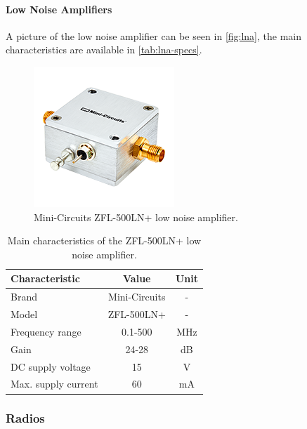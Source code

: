 \paragraph{Low Noise Amplifiers}

A picture of the low noise amplifier can be seen in \autoref{fig:lna}, the main characteristics are available in \autoref{tab:lna-specs}.

\begin{figure}[!ht]
    \begin{center}
        \includegraphics[width=150pt]{figures/lna.png}
        \caption{Mini-Circuits ZFL-500LN+ low noise amplifier.}
        \label{fig:lna}
    \end{center}
\end{figure}

\begin{table}[ht]
    \centering
    \begin{tabular}{lcc}
        \toprule[1.5pt]
        \textbf{Characteristic} & \textbf{Value}    & \textbf{Unit} \\
        \midrule
        Brand                   & Mini-Circuits     & - \\
        Model                   & ZFL-500LN+        & - \\
        Frequency range         & 0.1-500           & MHz \\
        Gain                    & 24-28             & dB \\
        DC supply voltage       & 15                & V \\
        Max. supply current     & 60                & mA \\
        \bottomrule[1.5pt]
    \end{tabular}
    \caption{Main characteristics of the ZFL-500LN+ low noise amplifier.}
    \label{tab:lna-specs}
\end{table}

\subsubsection{Radios}

